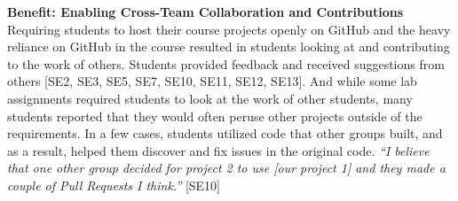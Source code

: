 


\textbf{Benefit: Enabling Cross-Team Collaboration and Contributions}\\
Requiring students to host their course projects openly on GitHub and the heavy reliance on GitHub in the course resulted in students looking at and contributing to the work of others. Students provided feedback and received suggestions from others [SE2, SE3, SE5, SE7, SE10, SE11, SE12, SE13]. And while some lab assignments required students to look at the work of other students, many students reported that they would often peruse other projects outside of the requirements. In a few cases, students utilized code that other groups built, and as a result, helped them discover and fix issues in the original code. \textit{``I believe that one other group decided for project 2 to use [our project 1] and they made a couple of Pull Requests I think.''} [SE10]

